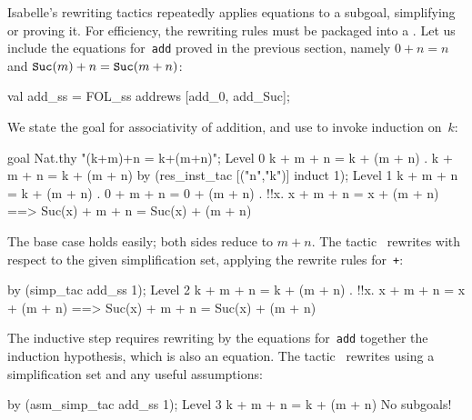 Isabelle's rewriting tactics repeatedly applies equations to a subgoal,
simplifying or proving it.  For efficiency, the rewriting rules must be
packaged into a .  Let us include the equations
for~{\tt add} proved in the previous section, namely $0+n=n$ and ${\tt
  Suc}(m)+n={\tt Suc}(m+n)$: 
\begin{ttbox} 
val add_ss = FOL_ss addrews [add_0, add_Suc];
\end{ttbox} 
We state the goal for associativity of addition, and
use  to invoke induction on~$k$:
\begin{ttbox} 
goal Nat.thy "(k+m)+n = k+(m+n)";
{\out Level 0}
{\out k + m + n = k + (m + n)}
{. k + m + n = k + (m + n)}
\ttbreak
by (res_inst_tac [("n","k")] induct 1);
{\out Level 1}
{\out k + m + n = k + (m + n)}
{. 0 + m + n = 0 + (m + n)}
{. !!x. x + m + n = x + (m + n) ==> Suc(x) + m + n = Suc(x) + (m + n)}
\end{ttbox} 
The base case holds easily; both sides reduce to $m+n$.  The
tactic~ rewrites with respect to the given simplification
set, applying the rewrite rules for~{\tt +}:
\begin{ttbox} 
by (simp_tac add_ss 1);
{\out Level 2}
{\out k + m + n = k + (m + n)}
{. !!x. x + m + n = x + (m + n) ==> Suc(x) + m + n = Suc(x) + (m + n)}
\end{ttbox} 
The inductive step requires rewriting by the equations for~{\tt add}
together the induction hypothesis, which is also an equation.  The
tactic~ rewrites using a simplification set and any
useful assumptions:
\begin{ttbox} 
by (asm_simp_tac add_ss 1);
{\out Level 3}
{\out k + m + n = k + (m + n)}
{\out No subgoals!}
\end{ttbox} 


